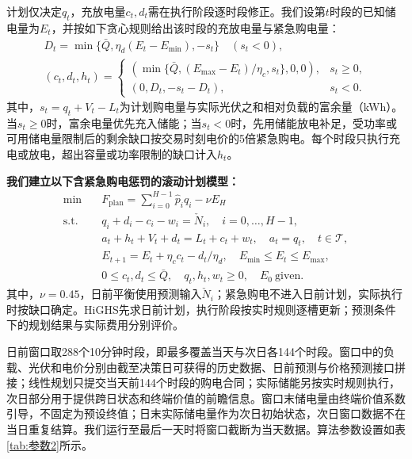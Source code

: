 计划仅决定$q_t$，充放电量$c_t,d_t$需在执行阶段逐时段修正。我们设第$t$时段的已知储电量为$E_t$，并按如下贪心规则给出该时段的充放电量与紧急购电量：
\begin{equation}\label{eq:src28}
 \begin{gathered}
 D_t=\min\{\bar Q,\eta_d(E_t-E_{\min}),-s_t\}\quad(s_t<0),\\
 (c_t,d_t,h_t)=
 \begin{cases}
 (\min\{\bar Q,(E_{\max}-E_t)/\eta_c,s_t\},0,0),&s_t\ge0,\\[1mm]
 (0,D_t,-s_t-D_t),&s_t<0.
 \end{cases}
 \end{gathered}
\end{equation}
其中，$s_t=q_t+V_t-L_t$为计划购电量与实际光伏之和相对负载的富余量（kWh）。当$s_t\ge0$时，富余电量优先充入储能；当$s_t<0$时，先用储能放电补足，受功率或可用储电量限制后的剩余缺口按交易时刻电价的5倍紧急购电。每个时段只执行充电或放电，超出容量或功率限制的缺口计入$h_t$。


\textbf{我们建立以下含紧急购电惩罚的滚动计划模型：}
\begin{equation}\label{eq:src29}
    \begin{aligned}
    \min\quad &F_{\mathrm{plan}}=\sum_{i=0}^{H-1}\hat p_iq_i-\nu E_H\\
    \mathrm{s.t.}\quad &q_i+d_i-c_i-w_i=\check N_i,\quad i=0,\ldots,H-1,\\
    &a_t+h_t+V_t+d_t=L_t+c_t+w_t,\quad a_t=q_t,\quad t\in\mathcal T,\\
    &E_{t+1}=E_t+\eta_c c_t-d_t/\eta_d,\quad E_{\min}\le E_t\le E_{\max},\\
    &0\le c_t,d_t\le\bar Q,\quad q_t,h_t,w_t\ge0,\quad E_0\ \text{given}.
    \end{aligned}
\end{equation}
其中，$\nu=0.45$，日前平衡使用预测输入$\check N_i$；紧急购电不进入日前计划，实际执行时按缺口确定。HiGHS先求日前计划，执行阶段按实时规则逐槽更新；预测条件下的规划结果与实际费用分别评价\cite{birge2011stochastic}。

日前窗口取288个10分钟时段，即最多覆盖当天与次日各144个时段。窗口中的负载、光伏和电价分别由截至决策日可获得的历史数据、日前预测与价格预测接口拼接；线性规划只提交当天前144个时段的购电合同；实际储能另按实时规则执行，次日部分用于提供跨日状态和终端价值的前瞻信息。窗口末储电量由终端价值系数引导，不固定为预设终值；日末实际储电量作为次日初始状态，次日窗口数据不在当日重复结算。我们运行至最后一天时将窗口截断为当天数据。算法参数设置如表\ref{tab:参数2}所示。

